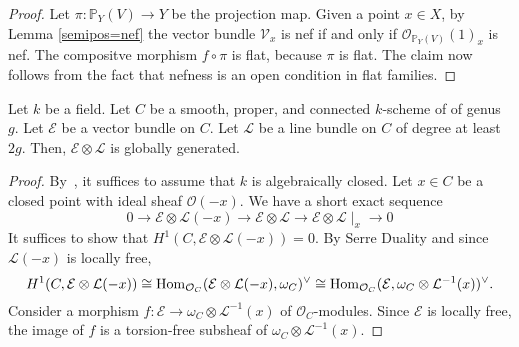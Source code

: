 \begin{proof}
Let $\pi:\mathbb{P}_Y(V)\to Y$ be the projection map.
Given a point $x\in X$, by Lemma \ref{semipos=nef} the vector bundle
$\mathcal{V}_x$ is nef if and only if
$\mathcal{O}_{\mathbb{P}_Y(V)}(1)_x$ is nef.
The compositve morphism $f\circ \pi$ is flat, because $\pi$ is flat.
The claim now follows from the fact that nefness is an open condition in flat
families.
\end{proof}

\begin{lemma}\label{global_generation_of_twist_on_curve}
Let $k$ be a field.
Let $C$ be a smooth, proper, and connected $k$-scheme of of genus $g$.
Let $\mathcal{E}$ be a vector bundle on $C$.
Let $\mathcal{L}$ be a line bundle on $C$ of degree at least $2g$.
Then, $\mathcal{E}\otimes\mathcal{L}$ is globally generated.
\end{lemma}

\begin{proof}
By~, it suffices to assume that $k$ is algebraically closed.
Let $x\in C$ be a closed point with ideal sheaf $\mathcal{O}(-x)$.
We have a short exact sequence
\begin{equation}
  0 \to
  \mathcal{E} \otimes \mathcal{L}(-x) \to
  \mathcal{E} \otimes \mathcal{L} \to
  \mathcal{E} \otimes \mathcal{L}\mid_x \to
  0
\end{equation}
It suffices to show that $H^1(C,\mathcal{E}\otimes\mathcal{L}(-x)) = 0$.
By Serre Duality and
since $\mathcal{L}(-x)$ is locally free,
$$
H^1(C,\mathcal{E}\otimes\mathcal{L}(-x)) \cong
  \mathop{\rm Hom}\nolimits_{\mathcal{O}_C}(\mathcal{E} \otimes \mathcal{L}(-x),\omega_C)^\vee \cong
  \mathop{\rm Hom}\nolimits_{\mathcal{O}_C}(\mathcal{E},\omega_C\otimes\mathcal{L}^{-1}(x))^\vee.
$$
Consider a morphism $f : \mathcal{E} \to \omega_C \otimes \mathcal{L}^{-1}(x)$
of $\mathcal{O}_C$-modules.
Since $\mathcal{E}$ is locally free, the image of $f$ is a torsion-free
subsheaf of $\omega_C \otimes \mathcal{L}^{-1}(x)$.
\end{proof}


